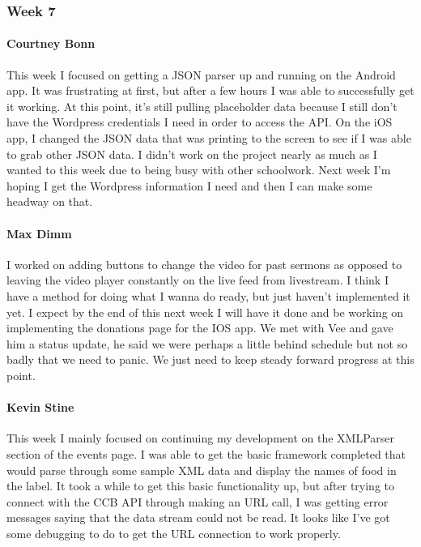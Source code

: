 		\subsubsection{Week 7}
		
			\paragraph{Courtney Bonn}
			This week I focused on getting a JSON parser up and running on the Android app. It was frustrating at first, but after a few hours I was able to successfully get it working. At this point, it's still pulling placeholder data because I still don't have the Wordpress credentials I need in order to access the API. On the iOS app, I changed the JSON data that was printing to the screen to see if I was able to grab other JSON data. I didn't work on the project nearly as much as I wanted to this week due to being busy with other schoolwork. Next week I'm hoping I get the Wordpress information I need and then I can make some headway on that.

			\paragraph{Max Dimm}
			I worked on adding buttons to change the video for past sermons as opposed to leaving the video player constantly on the live feed from livestream. I think I have a method for doing what I wanna do ready, but just haven't implemented it yet. I expect by the end of this next week I will have it done and be working on implementing the donations page for the IOS app. We met with Vee and gave him a status update, he said we were perhaps a little behind schedule but not so badly that we need to panic. We just need to keep steady forward progress at this point.
			
			\paragraph{Kevin Stine}
			This week I mainly focused on continuing my development on the XMLParser section of the events page. I was able to get the basic framework completed that would parse through some sample XML data and display the names of food in the label. It took a while to get this basic functionality up, but after trying to connect with the CCB API through making an URL call, I was getting error messages saying that the data stream could not be read. It looks like I've got some debugging to do to get the URL connection to work properly.
			
